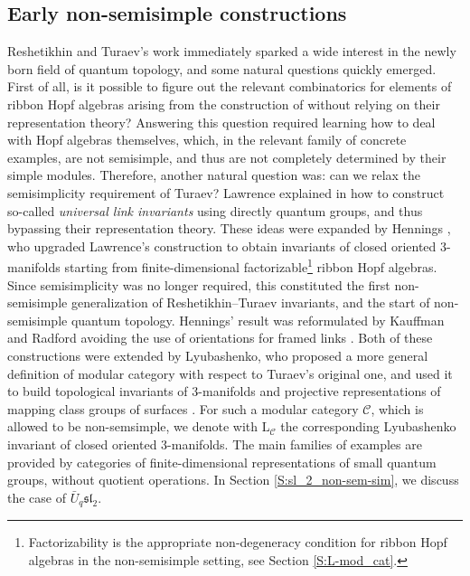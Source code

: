 \documentclass[a4paper,reqno]{amsart}
\theoremstyle{definition}
\theoremstyle{remark}
\newcommand{\rmL}{\mathrm{L}}
\newcommand{\calC}{\mathcal{C}}
\newcommand{\fsl}{\mathfrak{sl}}
\begin{document}
\subsection*{Early non-semisimple constructions}

Reshetikhin and Turaev's work immediately sparked a wide interest in the newly born field of quantum topology, and some natural questions quickly emerged. First of all, is it possible to figure out the relevant combinatorics for elements of ribbon Hopf algebras arising from the construction of \cite{RT90} without relying on their representation theory? Answering this question required learning how to deal with Hopf algebras themselves, which, in the relevant family of concrete examples, are not semisimple, and thus are not completely determined by their simple modules. Therefore, another natural question was: can we relax the semisimplicity requirement of Turaev? Lawrence explained in \cite{La90} how to construct so-called \textit{universal link invariants} using directly quantum groups, and thus bypassing their representation theory. These ideas were expanded by Hennings \cite{H96}, who upgraded Lawrence's construction to obtain invariants of closed oriented 3-manifolds starting from finite-dimensional factorizable\footnote{Factorizability is the appropriate non-degeneracy condition for ribbon Hopf algebras in the non-semisimple setting, see Section \ref{S:L-mod_cat}.} ribbon Hopf algebras. Since semisimplicity was no longer required, this constituted the first non-semisimple generalization of Reshetikhin--Turaev invariants, and the start of non-semisimple quantum topology. Hennings' result was reformulated by Kauffman and Radford avoiding the use of orientations for framed links \cite{KR94}. Both of these constructions were extended by Lyubashenko, who proposed a more general definition of modular category with respect to Turaev's original one, and used it to build topological invariants of 3-manifolds and projective representations of mapping class groups of surfaces \cite{L94}. For such a modular category $\calC$, which is allowed to be non-semsimple, we denote with $\rmL_\calC$ the corresponding Lyubashenko invariant of closed oriented 3-manifolds. The main families of examples are provided by categories of finite-dimensional representations of small quantum groups, without quotient operations. In Section \ref{S:sl_2_non-sem-sim}, we discuss the case of $\bar{U}_q \fsl_2$. 
\end{document}

